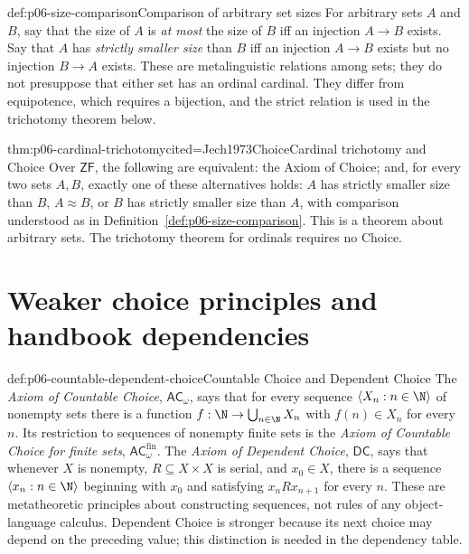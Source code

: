 \begin{hbdefinition}{def:p06-size-comparison}{Comparison of arbitrary set sizes}
For arbitrary sets \(A\) and \(B\), say that the size of \(A\) is
\emph{at most} the size of \(B\) iff an injection \(A\to B\) exists.  Say
that \(A\) has \emph{strictly smaller size} than \(B\) iff an injection
\(A\to B\) exists but no injection \(B\to A\) exists.  These are
metalinguistic relations among sets; they do not presuppose that either set
has an ordinal cardinal.  They differ from equipotence, which requires a
bijection, and the strict relation is used in the trichotomy theorem below.
\end{hbdefinition}

\begin{hbtheorem}{thm:p06-cardinal-trichotomy}{cited=Jech1973Choice}{Cardinal trichotomy and Choice}
Over \(\mathsf{ZF}\), the following are equivalent: the Axiom of Choice; and,
for every two sets \(A,B\), exactly one of these alternatives holds:
\(A\) has strictly smaller size than \(B\), \(A\approx B\), or \(B\) has
strictly smaller size than \(A\), with comparison understood as in
Definition~\ref{def:p06-size-comparison}.  This is a theorem about
arbitrary sets.  The trichotomy theorem for ordinals requires no Choice.
\end{hbtheorem}

\section[Weaker choice principles]{Weaker choice principles and handbook dependencies}

\begin{hbdefinition}{def:p06-countable-dependent-choice}{Countable Choice and Dependent Choice}
The \emph{Axiom of Countable Choice}, \(\mathsf{AC}_{\omega}\), says that
for every sequence \(\langle X_n:n\in\N\rangle\) of nonempty sets there is
a function \(f:\N\to\bigcup_{n\in\N}X_n\) with \(f(n)\in X_n\) for every
\(n\).  Its restriction to sequences of nonempty finite sets is the
\emph{Axiom of Countable Choice for finite sets},
\(\mathsf{AC}_{\omega}^{\mathrm{fin}}\).  The \emph{Axiom of Dependent
Choice}, \(\mathsf{DC}\), says that whenever \(X\) is nonempty,
\(R\subseteq X\times X\) is serial, and \(x_0\in X\), there is a sequence
\(\langle x_n:n\in\N\rangle\) beginning with \(x_0\) and satisfying
\(x_nRx_{n+1}\) for every \(n\).
These are metatheoretic principles about constructing sequences, not rules of
any object-language calculus.  Dependent Choice is stronger because its next
choice may depend on the preceding value; this distinction is needed in the
dependency table.
\end{hbdefinition}

